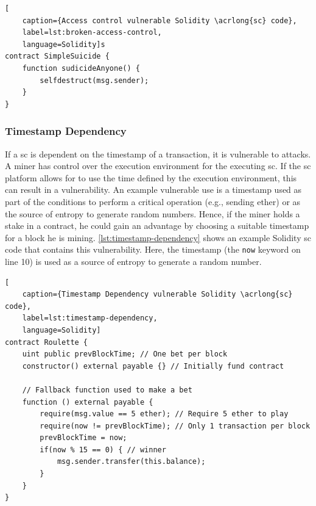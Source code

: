 \begin{lstlisting}[
    caption={Access control vulnerable Solidity \acrlong{sc} code},
    label=lst:broken-access-control,
    language=Solidity]s
contract SimpleSuicide {
    function sudicideAnyone() {
        selfdestruct(msg.sender);
    }
}
\end{lstlisting}

\subsubsection{Timestamp Dependency}
If a \acrlong{sc} is dependent on the timestamp of a transaction, it is vulnerable to attacks. A miner has control over the execution environment for the executing \acrshort{sc}. If the \acrshort{sc} platform allows for  to use the time defined by the execution environment, this can result in a vulnerability. An example vulnerable use is a timestamp used as part of the conditions to perform a critical operation (e.g., sending ether) or as the source of entropy to generate random numbers. Hence, if the miner holds a stake in a contract, he could gain an advantage by choosing a suitable timestamp for a block he is mining. \cref{lst:timestamp-dependency} shows an example Solidity \acrshort{sc} code that contains this vulnerability. Here, the timestamp (the \lstinline[language=Solidity]!now! keyword on line 10) is used as a source of entropy to generate a random number.

\begin{lstlisting}[
    caption={Timestamp Dependency vulnerable Solidity \acrlong{sc} code},
    label=lst:timestamp-dependency,
    language=Solidity]
contract Roulette {
    uint public prevBlockTime; // One bet per block
    constructor() external payable {} // Initially fund contract
    
    // Fallback function used to make a bet
    function () external payable {
        require(msg.value == 5 ether); // Require 5 ether to play
        require(now != prevBlockTime); // Only 1 transaction per block
        prevBlockTime = now;
        if(now % 15 == 0) { // winner
            msg.sender.transfer(this.balance);
        }
    }
}
\end{lstlisting}

